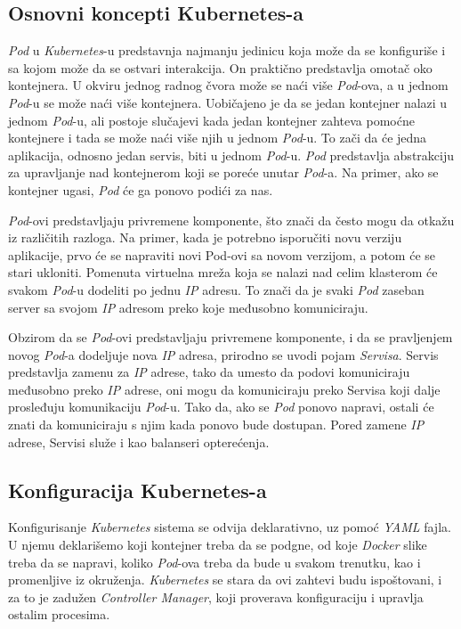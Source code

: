 \subsection{Osnovni koncepti Kubernetes-a}
{\em Pod} u \textit{Kubernetes}-u predstavnja najmanju jedinicu koja može da se konfiguriše i sa kojom može da 
se ostvari interakcija. On praktično predstavlja omotač oko kontejnera. U okviru jednog radnog čvora 
može se naći više \textit{Pod}-ova, a u jednom \textit{Pod}-u se može naći više kontejnera. Uobičajeno je da se jedan 
kontejner nalazi u jednom \textit{Pod}-u, ali postoje slučajevi kada jedan kontejner zahteva pomoćne kontejnere 
i tada se može naći više njih u jednom \textit{Pod}-u. To zači da će jedna aplikacija, odnosno jedan servis, 
biti u jednom \textit{Pod}-u. \textit{Pod} predstavlja abstrakciju za upravljanje nad kontejnerom koji se poreće unutar
\textit{Pod}-a. Na primer, ako se kontejner ugasi, \textit{Pod} će ga ponovo podići za nas. 

\textit{Pod}-ovi predstavljaju privremene komponente, što znači da često mogu da otkažu iz različitih razloga. 
Na primer, kada je potrebno isporučiti novu verziju aplikacije, prvo će se napraviti novi Pod-ovi sa 
novom verzijom, a potom će se stari ukloniti. Pomenuta virtuelna mreža koja se nalazi nad celim 
klasterom će svakom \textit{Pod}-u dodeliti po jednu \textit{IP} adresu. To znači da je svaki \textit{Pod} zaseban server sa 
svojom \textit{IP} adresom preko koje međusobno komuniciraju.

Obzirom da se \textit{Pod}-ovi predstavljaju privremene komponente, i da se pravljenjem novog \textit{Pod}-a dodeljuje 
nova \textit{IP} adresa, prirodno se uvodi pojam {\em Servisa}. Servis predstavlja zamenu za \textit{IP} adrese, tako 
da umesto da podovi komuniciraju međusobno preko \textit{IP} adrese, oni mogu da komuniciraju preko Servisa 
koji dalje prosleđuju komunikaciju \textit{Pod}-u. Tako da, ako se \textit{Pod} ponovo napravi, ostali će znati da komuniciraju 
s njim kada ponovo bude dostupan. Pored zamene \textit{IP} adrese, Servisi služe i kao balanseri opterećenja. 

\subsection{Konfiguracija Kubernetes-a}
Konfigurisanje \textit{Kubernetes} sistema se odvija deklarativno, uz pomoć \textit{YAML} fajla. U njemu deklarišemo
koji kontejner treba da se podgne, od koje \textit{Docker} slike treba da se napravi, koliko \textit{Pod}-ova treba 
da bude u svakom trenutku, kao i promenljive iz okruženja. \textit{Kubernetes} se stara da ovi zahtevi budu 
ispoštovani, i za to je zadužen \textit{Controller Manager}, koji proverava konfiguraciju i upravlja ostalim 
procesima. 

